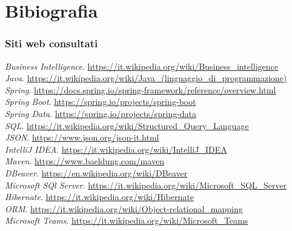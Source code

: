 \cleardoublepage
\chapter{Bibiografia}

\nocite{*}

\printbibliography[heading=subbibliography,title={Riferimenti bibliografici},type=book]

\printbibliography[heading=subbibliography,title={Siti web consultati},type=online]

\subsection*{Siti web consultati}
\textit{Business Intelligence}. \url{https://it.wikipedia.org/wiki/Business\_intelligence}
\\
\smallskip %
\textit{Java}. \url{https://it.wikipedia.org/wiki/Java\_(linguaggio\_di\_programmazione)}\\
\smallskip
\textit{Spring}. \url{https://docs.spring.io/spring-framework/reference/overview.html} %
\\
\smallskip
\textit{Spring Boot}. \url{https://spring.io/projects/spring-boot}
\\
\smallskip
\textit{Spring Data}. \url{https://spring.io/projects/spring-data}\\
\smallskip
\textit{SQL}. \url{https://it.wikipedia.org/wiki/Structured\_Query\_Language}\\
\smallskip
\textit{JSON}. \url{https://www.json.org/json-it.html}\\
\smallskip
\textit{IntelliJ IDEA}. \url{https://it.wikipedia.org/wiki/IntelliJ\_IDEA}\\
\smallskip
\textit{Maven}. \url{https://www.baeldung.com/maven}\\
\smallskip %
\textit{DBeaver}. \url{https://en.wikipedia.org/wiki/DBeaver}\\
\smallskip
\textit{Microsoft SQl Server}. \url{https://it.wikipedia.org/wiki/Microsoft\_SQL\_Server}\\
\smallskip
\textit{Hibernate}. \url{https://it.wikipedia.org/wiki/Hibernate}\\
\smallskip
\textit{ORM}. \url{https://it.wikipedia.org/wiki/Object-relational\_mapping}\\
\smallskip
\textit{Microsoft Teams}. \url{https://it.wikipedia.org/wiki/Microsoft\_Teams}\\
